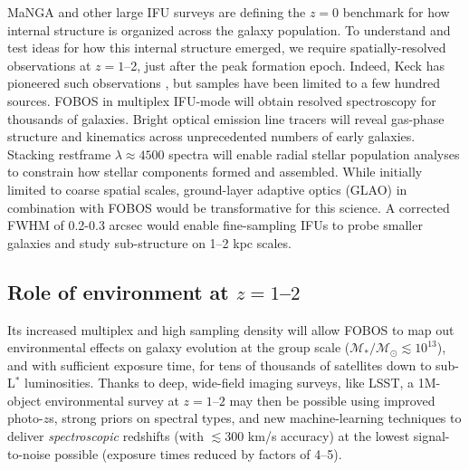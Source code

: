 MaNGA \citep{bundy15} and other large IFU surveys are defining the
$z=0$ benchmark for how internal structure is organized across the
galaxy population. To understand and test ideas for how this internal
structure emerged, we require spatially-resolved observations at $z =
1$--2, just after the peak formation epoch. Indeed, Keck has
pioneered such observations \citep[e.g.,][]{erb04, miller11,law09},
but samples have been limited to a few hundred sources. FOBOS in
multiplex IFU-mode will obtain resolved spectroscopy for thousands of
galaxies. Bright optical emission line tracers will reveal gas-phase
structure and kinematics across unprecedented numbers of early
galaxies. Stacking restframe $\lambda \approx 4500$ spectra will
enable radial stellar population analyses to constrain how stellar
components formed and assembled. While initially limited to coarse
spatial scales, ground-layer adaptive optics (GLAO) in combination with FOBOS would be
transformative for this science. A corrected FWHM of 0.2-0.3 arcsec
would enable fine-sampling IFUs to probe smaller galaxies and study
sub-structure on 1--2 kpc scales.

\subsection{Role of environment at $z=1$--$2$ }

Its increased multiplex and high sampling density will allow FOBOS to
map out environmental effects on galaxy evolution at the group scale
($\mathcal{M_\ast/M_\odot} \lesssim 10^{13}$), and with sufficient
exposure time, for tens of thousands of satellites down to sub-L$^*$
luminosities. Thanks to deep, wide-field imaging surveys, like LSST,
a 1M-object environmental survey at $z=1$--$2$ may then be possible
using improved photo-$z$s, strong priors on spectral types, and new
machine-learning techniques to deliver {\it spectroscopic} redshifts
(with $\lesssim$300 km/s accuracy) at the lowest signal-to-noise
possible (exposure times reduced by factors of 4--5).



